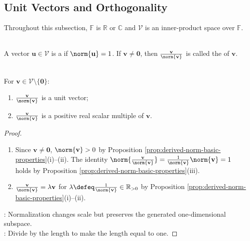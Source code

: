 \subsection{Unit Vectors and Orthogonality}

Throughout this subsection, $\mathbb{F}$ is $\mathbb{R}$ or $\mathbb{C}$ and $\mathcal{V}$ is an inner-product space over $\mathbb{F}$.

\begin{definition} \label{def:unit-vector-and-normalization} \\
A vector $\mathbf{u}\in\mathcal{V}$ is a  if $\norm{\mathbf{u}}=1$. If $\mathbf{v}\neq\mathbf{0}$, then $\frac{\mathbf{v}}{\norm{\mathbf{v}}}$ is called the  of $\mathbf{v}$.
\end{definition}

\begin{proposition} \label{prop:normalization-gives-unit-vector} \\
For $\mathbf{v}\in\mathcal{V}\setminus\{\mathbf{0}\}$:
\begin{enumerate}[label=(\roman*)]
\setlength{\itemsep}{0pt}
\item $\frac{\mathbf{v}}{\norm{\mathbf{v}}}$ is a unit vector;
\item $\frac{\mathbf{v}}{\norm{\mathbf{v}}}$ is a positive real scalar multiple of $\mathbf{v}$.
\end{enumerate}
\begin{proof}
\begin{enumerate}[label=(\roman*)]
\setlength{\itemsep}{0pt}
\item[$(i)$] Since $\mathbf{v}\neq\mathbf{0}$, $\norm{\mathbf{v}}>0$ by Proposition \ref{prop:derived-norm-basic-properties}(i)--(ii). The identity $\norm{\frac{\mathbf{v}}{\norm{\mathbf{v}}}}=\frac{1}{\norm{\mathbf{v}}}\norm{\mathbf{v}}=1$ holds by Proposition \ref{prop:derived-norm-basic-properties}(iii).
\item[$(ii)$] $\frac{\mathbf{v}}{\norm{\mathbf{v}}}=\lambda\mathbf{v}$ for $\lambda\defeq\frac{1}{\norm{\mathbf{v}}}\in\mathbb{R}_{>0}$ by Proposition \ref{prop:derived-norm-basic-properties}(i)--(ii).
\end{enumerate}
: Normalization changes scale but preserves the generated one-dimensional subspace.\\
: Divide by the length to make the length equal to one.
\end{proof}
\end{proposition}

